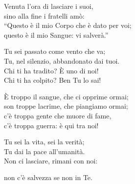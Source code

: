 
\strofa Venuta l'ora di lasciare i suoi,\\
sino alla fine i fratelli amò:\\
``Questo è il mio Corpo che è dato per voi;\\
questo è il mio Sangue: vi salverà.''

\spazio

\strofa Tu sei passato come vento che va;\\
Tu, nel silenzio, abbandonato dai tuoi.\\
Chi ti ha tradito? È uno di noi!\\
Chi ti ha colpito? Ben Tu lo sai!

\spazio

\strofa È troppo il sangue, che ci opprime ormai;\\
son troppe lacrime, che piangiamo ormai;\\
c'è troppa gente che muore di fame,\\
c'è troppa guerra: è qui tra noi!

\spazio

\strofa Tu sei la vita, sei la verità;\\
Tu dai la pace all'umanità.\\
Non ci lasciare, rimani con noi:

\spazio

non c'è salvezza se non in Te. 
